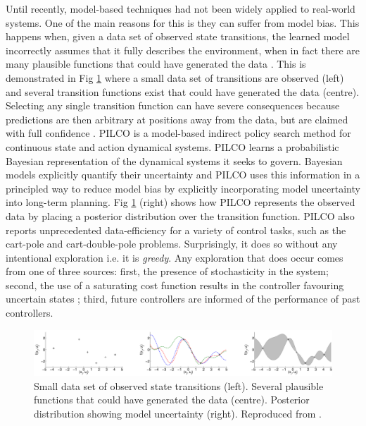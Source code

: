 Until recently, model-based techniques had not been widely applied to real-world systems. One of the main reasons for this is they can suffer from model bias. This happens when, given a data set of observed state transitions, the learned model incorrectly assumes that it fully describes the environment, when in fact there are many plausible functions that could have generated the data \citep{atkeson1997comparison}\citep{schneider1997exploiting}. This is demonstrated in Fig \ref{Fig:model-bias} where a small data set of transitions are observed (left) and several transition functions exist that could have generated the data (centre). Selecting any single transition function can have severe consequences because predictions are then arbitrary at positions away from the data, but are claimed with full confidence \citep{deisenroth2011pilco}. 
PILCO \citep{deisenroth2011pilco} is a model-based indirect policy search method for continuous state and action dynamical systems. PILCO learns a probabilistic Bayesian representation of the dynamical systems it seeks to govern. Bayesian models explicitly quantify their uncertainty and PILCO uses this information in a principled way to reduce model bias by explicitly incorporating model uncertainty into long-term planning. Fig \ref{Fig:model-bias} (right) shows how PILCO represents the observed data by placing a posterior distribution over the transition function. PILCO also reports unprecedented data-efficiency for a variety of control tasks, such as the cart-pole and cart-double-pole problems. Surprisingly, it does so without any intentional exploration i.e. it is \textit{greedy}. Any exploration that does occur comes from one of three sources: first, the presence of stochasticity in the system; second, the use of a saturating cost function results in the controller favouring uncertain states \citep{deisenroth2013gaussian}; third, future controllers are informed of the performance of past controllers. 

\begin{figure}
\centering    
\includegraphics[width=1.0\textwidth]{Chapter1/Figures/PILCO-model-bias.png}
\caption[Model-based bias in reinforcement learning]{Small data set of observed state transitions (left). Several plausible functions that could have generated the data (centre). Posterior distribution showing model uncertainty (right). Reproduced from \citep{deisenroth2011pilco}.}
\label{Fig:model-bias}
\end{figure}

